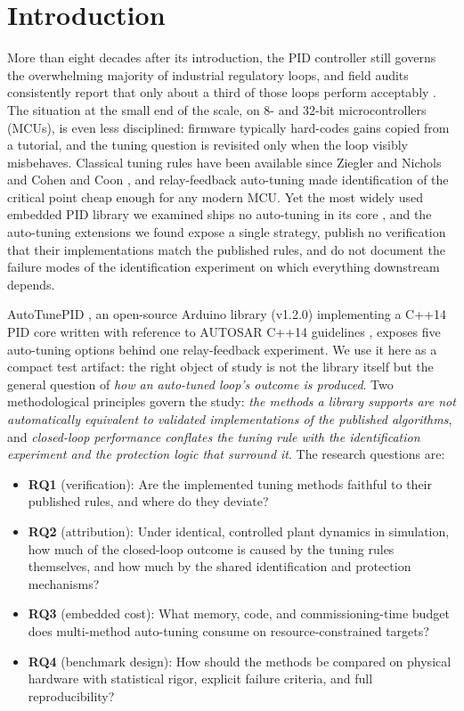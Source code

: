 \documentclass[10pt,twocolumn]{article}
\begin{document}
\section{Introduction}

More than eight decades after its introduction, the PID controller still governs the overwhelming majority of industrial regulatory loops, and field audits consistently report that only about a third of those loops perform acceptably \cite{desborough2002, samad2017}. The situation at the small end of the scale, on 8- and 32-bit microcontrollers (MCUs), is even less disciplined: firmware typically hard-codes gains copied from a tutorial, and the tuning question is revisited only when the loop visibly misbehaves. Classical tuning rules have been available since Ziegler and Nichols \cite{ziegler1942} and Cohen and Coon \cite{cohen1953}, and relay-feedback auto-tuning \cite{astrom1984} made identification of the critical point cheap enough for any modern MCU. Yet the most widely used embedded PID library we examined ships no auto-tuning in its core \cite{beauregard2011}, and the auto-tuning extensions we found expose a single strategy, publish no verification that their implementations match the published rules, and do not document the failure modes of the identification experiment on which everything downstream depends.

AutoTunePID \cite{autotunepid}, an open-source Arduino library (v1.2.0) implementing a C++14 PID core written with reference to AUTOSAR C++14 guidelines \cite{autosar}, exposes five auto-tuning options behind one relay-feedback experiment. We use it here as a compact test artifact: the right object of study is not the library itself but the general question of \emph{how an auto-tuned loop's outcome is produced}. Two methodological principles govern the study: \emph{the methods a library supports are not automatically equivalent to validated implementations of the published algorithms}, and \emph{closed-loop performance conflates the tuning rule with the identification experiment and the protection logic that surround it}. The research questions are:

\begin{itemize}
\item \textbf{RQ1} (verification): Are the implemented tuning methods faithful to their published rules, and where do they deviate?
\item \textbf{RQ2} (attribution): Under identical, controlled plant dynamics in simulation, how much of the closed-loop outcome is caused by the tuning rules themselves, and how much by the shared identification and protection mechanisms?
\item \textbf{RQ3} (embedded cost): What memory, code, and commissioning-time budget does multi-method auto-tuning consume on resource-constrained targets?
\item \textbf{RQ4} (benchmark design): How should the methods be compared on physical hardware with statistical rigor, explicit failure criteria, and full reproducibility?
\end{itemize}
\end{document}
